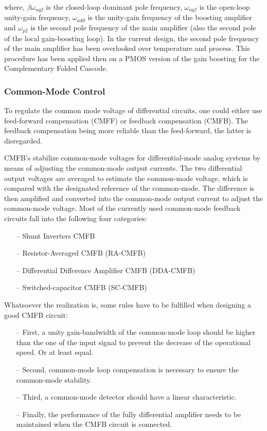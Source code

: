 where, \(\beta\omega_{ugf} \) is the closed-loop dominant pole frequency, \(\omega_{ugf} \) is the open-loop unity-gain frequency, \(\omega_{add} \) is the unity-gain frequency of the boosting amplifier and \(\omega_{p2} \) is the second pole frequency of the main amplifier (also the second pole of the local gain-boosting loop). In the current design, the second pole frequency of the main amplifier has been overlooked over temperature and process. This procedure has been applied then on a PMOS version of the gain boosting for the Complementary Folded Cascode.

\subsubsection{Common-Mode Control}
To regulate the common mode voltage of differential circuits, one could either use feed-forward compensation (CMFF) or feedback compensation (CMFB). The feedback compensation being more reliable than the feed-forward, the latter is disregarded.

CMFB’s stabilize common-mode voltages for differential-mode analog systems by means of adjusting the common-mode output currents. The two differential output voltages are averaged to estimate the common-mode voltage, which is compared with the designated reference of the common-mode. The difference is then amplified and converted into the common-mode output current to adjust the common-mode voltage. Most of the currently used common-mode feedback circuits fall into the following four categories:

\begin{itemize}
    \itemsep-0.5em
    \item[--] Shunt Inverters CMFB
    \item[--] Resistor-Averaged CMFB (RA-CMFB)
    \item[--] Differential Difference Amplifier CMFB (DDA-CMFB)
    \item[--] Switched-capacitor CMFB (SC-CMFB)
\end{itemize}

Whatsoever the realization is, some rules have to be fulfilled when designing a good CMFB circuit:

\begin{itemize}
    \itemsep-0.5em
    \item[--] First, a unity gain-bandwidth of the common-mode loop should be higher than the one of the input signal to prevent the decrease of the operational speed. Or at least equal.
    \item[--] Second, common-mode loop compensation is necessary to ensure the common-mode stability.
    \item[--] Third, a common-mode detector should have a linear characteristic.
    \item[--] Finally, the performance of the fully differential amplifier needs to be maintained when the CMFB circuit is connected.
\end{itemize}

